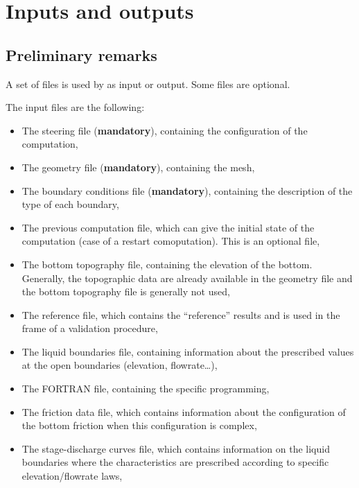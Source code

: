 \chapter{Inputs and outputs}
\label{ch:inp:outp}

\section{Preliminary remarks}

A set of files is used by  as input or output.
Some files are optional.

The input files are the following:

\begin{itemize}
\item The steering file (\textbf{mandatory}), containing the configuration
of the computation,

\item The geometry file (\textbf{mandatory}), containing the mesh,

\item The boundary conditions file (\textbf{mandatory}), containing the
description of the type of each boundary,

\item The previous computation file, which can give the initial state of the
computation (case of a restart comoputation).
This is an optional file,

\item The bottom topography file, containing the elevation of the bottom.
Generally, the topographic data are already available in the
geometry file and the bottom topography file is generally not used,

\item The reference file, which contains the ``reference'' results
and is used in the frame of a validation procedure,

\item The liquid boundaries file, containing information about the prescribed
values at the open boundaries (elevation, flowrate\dots),

\item The FORTRAN file, containing the specific programming,

\item The friction data file, which contains information about the
configuration of the bottom friction when this configuration is complex,

\item The stage-discharge curves file, which contains information on the liquid
boundaries where the characteristics are prescribed according to specific
elevation/flowrate laws,


\end{itemize}
